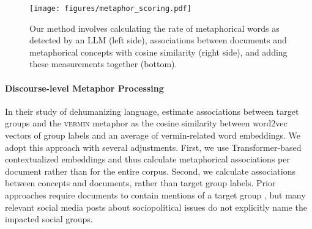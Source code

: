 \begin{figure}[t!]
    \centering
    \texttt{[image: figures/metaphor\_scoring.pdf]}
    \caption{Our method involves calculating the rate of metaphorical words as detected by an LLM (left side), associations between documents and metaphorical concepts with cosine similarity (right side), and adding these measurements together (bottom).}
    \label{fig:metaphor-processing}
\end{figure}



\paragraph{Discourse-level Metaphor Processing}


In their study of dehumanizing language, \citet{mendelsohn2020framework} %
estimate associations between target groups and the \textsc{vermin} metaphor as the cosine similarity between word2vec vectors of group labels and an average of vermin-related word embeddings. We adopt this approach with several adjustments. First, we use Transformer-based contextualized embeddings 
and thus calculate metaphorical associations per document rather than for the entire corpus. Second, we calculate associations between concepts and documents, rather than target group labels. Prior approaches require documents to contain mentions of a target group \citep{mendelsohn2020framework,card2022computational}, but many relevant social media posts about sociopolitical issues do not explicitly name the impacted social groups.%



